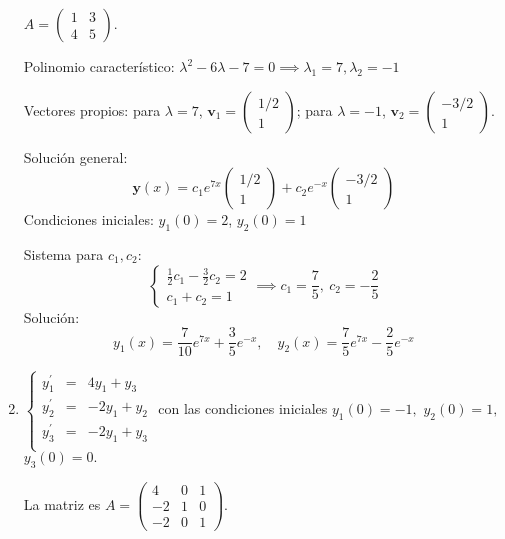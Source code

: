 \begin{prob}
\begin{enumerate}[$(a)$]
\begin{myproof}
$A = \begin{pmatrix} 1 & 3 \\ 4 & 5 \end{pmatrix}$.

Polinomio característico: $\lambda^2 - 6\lambda - 7 = 0 \implies \lambda_1=7, \lambda_2=-1$

Vectores propios: para $\lambda=7$, $\mathbf{v}_1 = \begin{pmatrix} 1/2 \\ 1 \end{pmatrix}$; para $\lambda=-1$, $\mathbf{v}_2 = \begin{pmatrix} -3/2 \\ 1 \end{pmatrix}$.

Solución general:
\[
\mathbf{y}(x) = c_1 e^{7x} \begin{pmatrix} 1/2 \\ 1 \end{pmatrix} + c_2 e^{-x} \begin{pmatrix} -3/2 \\ 1 \end{pmatrix}
\]
Condiciones iniciales: $y_1(0)=2$, $y_2(0)=1$

Sistema para $c_1, c_2$:
\[
\begin{cases}
\frac{1}{2}c_1 - \frac{3}{2}c_2 = 2 \\
c_1 + c_2 = 1
\end{cases}
\implies c_1 = \frac{7}{5},\ c_2 = -\frac{2}{5}
\]
Solución:
\[
y_1(x) = \frac{7}{10}e^{7x} + \frac{3}{5}e^{-x},\quad y_2(x) = \frac{7}{5}e^{7x} - \frac{2}{5}e^{-x}
\]
\end{myproof}

\item $\left\lbrace \begin{matrix}
y_{1}^{\prime}&=&4y_1+y_3\\
y_{2}^{\prime}&=&-2y_1+y_2\\
y_{3}^{\prime}&=&-2y_1+y_3\\
\end{matrix} \right. $ con las condiciones iniciales $y_{1}(0)=-1,$ $y_{2}(0)=1,$ $y_3(0)=0.$

\begin{myproof}
La matriz es $A = \begin{pmatrix} 4 & 0 & 1 \\ -2 & 1 & 0 \\ -2 & 0 & 1 \end{pmatrix}$.


\end{myproof}
\end{enumerate}
\end{prob}
